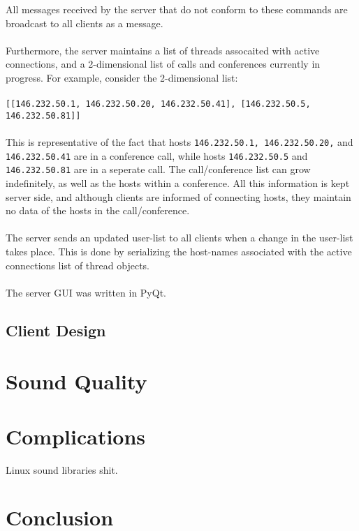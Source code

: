 \documentclass[10pt,a4paper]{article}
\begin{document}
All messages received by the server that do not conform to these commands are broadcast to all clients as a message.
\paragraph{}
Furthermore, the server maintains a list of threads assocaited with active connections,
and a 2-dimensional list of calls and conferences currently in progress. For example, consider the 2-dimensional list:
\paragraph{}
\verb|[[146.232.50.1, 146.232.50.20, 146.232.50.41], [146.232.50.5, 146.232.50.81]]|
\paragraph{}
This is representative of the fact that hosts \verb|146.232.50.1, 146.232.50.20,| and \verb|146.232.50.41| are in a conference call,
while hosts \verb|146.232.50.5| and \verb|146.232.50.81| are in a seperate call. The call/conference list can grow indefinitely,
as well as the hosts within a conference. All this information is kept server side, and although clients are informed of
connecting hosts, they maintain no data of the hosts in the call/conference.
\paragraph{}
The server sends an updated user-list to all clients when a change in the user-list takes place. This is done by serializing the
host-names associated with the  active connections list of thread objects.
\paragraph{}
The server GUI was written in PyQt.

\subsection{Client Design}


\section{Sound Quality} %

\section{Complications} %
\label{comp}

Linux sound libraries shit.

\section{Conclusion}
\end{document}
